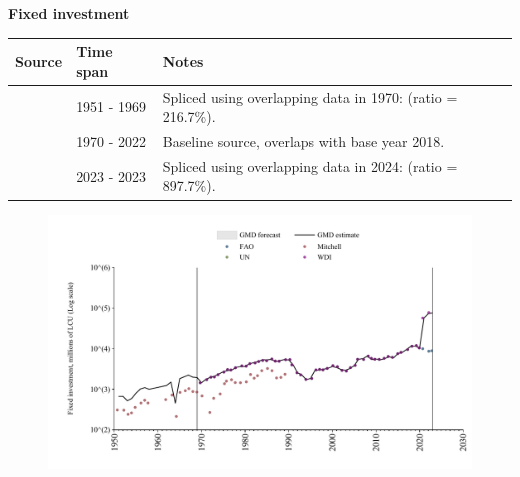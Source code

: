 \documentclass[12pt,a4paper,landscape]{article}
\begin{document}
\begin{adjustbox}{max totalsize={\paperwidth}{\paperheight},center}
\begin{minipage}[t][\textheight][t]{\textwidth}
\vspace*{0.5cm}
{}
\begin{center}
{\Large\bfseries Fixed investment}
\end{center}
\vspace{0.5cm}
\begin{table}[H]
\centering
\small
\begin{tabular}{|l|l|l|}
\hline
\textbf{Source} & \textbf{Time span} & \textbf{Notes} \\
\hline
\rowcolor{white}\cite{Mitchell}& 1951 - 1969 &Spliced using overlapping data in 1970: (ratio = 216.7\%). \\
\rowcolor{lightgray}\cite{WDI}& 1970 - 2022 &Baseline source, overlaps with base year 2018. \\
\rowcolor{white}\cite{FAO}& 2023 - 2023 &Spliced using overlapping data in 2024: (ratio = 897.7\%). \\
\hline
\end{tabular}
\end{table}
\begin{figure}[H]
\centering
\includegraphics[width=\textwidth,height=0.6\textheight,keepaspectratio]{graphs/CUB_finv.pdf}
\end{figure}
\end{minipage}
\end{adjustbox}
\end{document}
